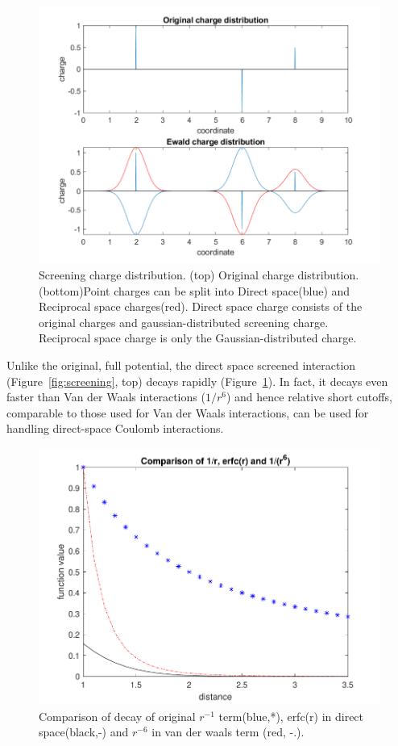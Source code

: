 \documentclass[9pt,bestpractices]{livecoms}
\begin{document}
\begin{figure}[h]
\centering
\includegraphics[width=\linewidth]{ewald.pdf}

    \caption{\label{fig:screening}Screening charge distribution. (top) Original charge distribution. (bottom)Point charges can be split into Direct space(blue) and Reciprocal space charges(red). Direct space charge consists of the original charges and gaussian-distributed screening charge. Reciprocal space charge is only the Gaussian-distributed charge. }
\label{charges_ewald}
\end{figure}

Unlike the original, full potential, the direct space screened interaction (Figure~\ref{fig:screening}, top) decays rapidly (Figure~\ref{charges_ewald}).
In fact, it decays even faster than Van der Waals interactions ($1/r^{6}$) and hence relative short cutoffs, comparable to those used for Van der Waals interactions, can be used for handling direct-space Coulomb interactions.


\begin{figure}[h]
\centering
\includegraphics[width=\linewidth]{decay_comparison.pdf}
    \caption{Comparison of decay of original $r^{-1}$ term(blue,*), erfc(r) in direct space(black,-) and $r^{-6}$ in van der waals term (red, -.).  }
\label{decay}
\end{figure}
\end{document}
